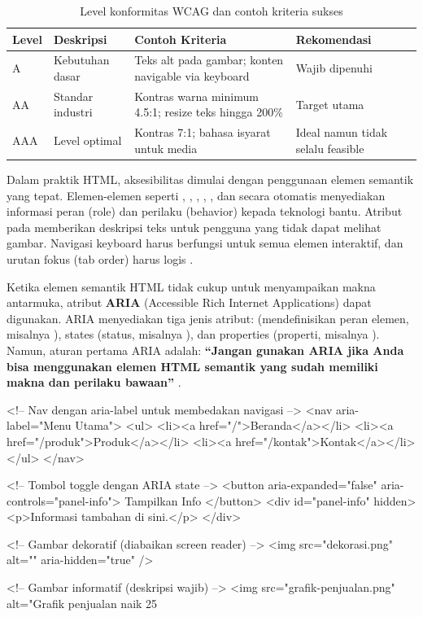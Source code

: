 \begin{table}[htbp]
\centering
\begin{tabular}{|P{1.5cm}|P{3.5cm}|P{3.5cm}|P{3.5cm}|}
\hline
\textbf{Level} & \textbf{Deskripsi} & \textbf{Contoh Kriteria} & \textbf{Rekomendasi} \\
\hline
A & Kebutuhan dasar & Teks alt pada gambar; konten navigable via keyboard & Wajib dipenuhi \\
\hline
AA & Standar industri & Kontras warna minimum 4.5:1; resize teks hingga 200\% & Target utama \\
\hline
AAA & Level optimal & Kontras 7:1; bahasa isyarat untuk media & Ideal namun tidak selalu feasible \\
\hline
\end{tabular}
\caption{Level konformitas WCAG dan contoh kriteria sukses}
\end{table}

Dalam praktik HTML, aksesibilitas dimulai dengan penggunaan elemen semantik yang tepat. Elemen-elemen seperti , , , , , dan  secara otomatis menyediakan informasi peran (role) dan perilaku (behavior) kepada teknologi bantu. Atribut  pada  memberikan deskripsi teks untuk pengguna yang tidak dapat melihat gambar. Navigasi keyboard harus berfungsi untuk semua elemen interaktif, dan urutan fokus (tab order) harus logis \cite{webdevAccessibility}.

Ketika elemen semantik HTML tidak cukup untuk menyampaikan makna antarmuka, atribut \textbf{ARIA} (Accessible Rich Internet Applications) dapat digunakan. ARIA menyediakan tiga jenis atribut:  (mendefinisikan peran elemen, misalnya ),  states (status, misalnya ), dan  properties (properti, misalnya ). Namun, aturan pertama ARIA adalah: \textbf{``Jangan gunakan ARIA jika Anda bisa menggunakan elemen HTML semantik yang sudah memiliki makna dan perilaku bawaan''} \cite{mdnAccessibility}.

\begin{webcode}[language=HTML, caption={Contoh penggunaan ARIA untuk navigasi dan tombol}]
<!-- Nav dengan aria-label untuk membedakan navigasi -->
<nav aria-label="Menu Utama">
  <ul>
    <li><a href="/">Beranda</a></li>
    <li><a href="/produk">Produk</a></li>
    <li><a href="/kontak">Kontak</a></li>
  </ul>
</nav>

<!-- Tombol toggle dengan ARIA state -->
<button aria-expanded="false"
        aria-controls="panel-info">
  Tampilkan Info
</button>
<div id="panel-info" hidden>
  <p>Informasi tambahan di sini.</p>
</div>

<!-- Gambar dekoratif (diabaikan screen reader) -->
<img src="dekorasi.png" alt="" aria-hidden="true" />

<!-- Gambar informatif (deskripsi wajib) -->
<img src="grafik-penjualan.png"
     alt="Grafik penjualan naik 25%
\end{webcode}

